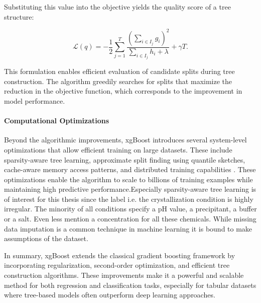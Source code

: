 Substituting this value into the objective yields the quality score of a tree structure:

\[
\mathcal{L}(q) =
-\frac{1}{2}
\sum_{j=1}^{T}
\frac{\left(\sum_{i \in I_j} g_i\right)^2}
{\sum_{i \in I_j} h_i + \lambda}
+
\gamma T.
\]

This formulation enables efficient evaluation of candidate splits during tree construction. The algorithm greedily searches for splits that maximize the reduction in the objective function, which corresponds to the improvement in model performance.


\paragraph{Computational Optimizations}

Beyond the algorithmic improvements, \gls{xgBoost} introduces several system-level optimizations that allow efficient training on large datasets. These include sparsity-aware tree learning, approximate split finding using quantile sketches, cache-aware memory access patterns, and distributed training capabilities \cite{Chen2016}.  These optimizations enable the algorithm to scale to billions of training examples while maintaining high predictive performance.Especially sparsity-aware tree learning is of interest for this thesis since the label i.e. the crystallization condition is highly irregular. The minority of all conditions specify a pH value, a precipitant, a buffer or a salt. Even less mention a concentration for all these chemicals. While missing data imputation is a common technique in machine learning it is bound to make assumptions of the dataset. 

In summary, \gls{xgBoost} extends the classical gradient boosting framework by incorporating regularization, second-order optimization, and efficient tree construction algorithms. These improvements make it a powerful and scalable method for both regression and classification tasks, especially for tabular datasets where tree-based models often outperform deep learning approaches.